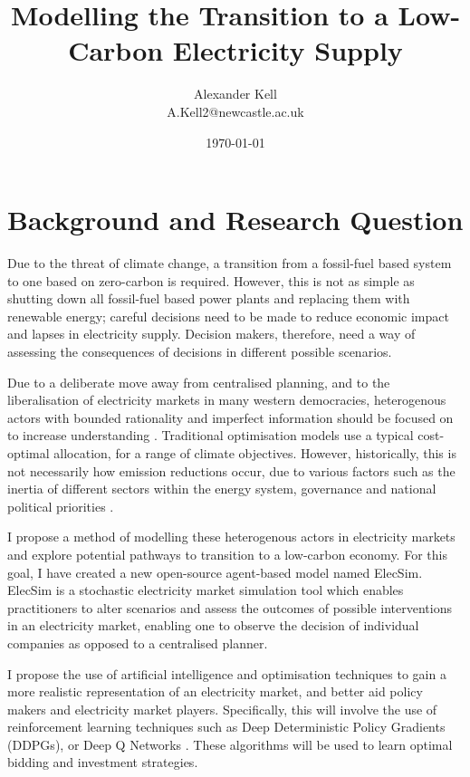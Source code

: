 \documentclass[12pt]{article}
\title{Modelling the Transition to a Low-Carbon Electricity Supply}
\author{Alexander Kell \\ {A.Kell2@newcastle.ac.uk}}
\date{\today}
\begin{document}
\maketitle

\clearpage

\section{Background and Research Question}



Due to the threat of climate change, a transition from a fossil-fuel based system to one based on zero-carbon is required. However, this is not as simple as shutting down all fossil-fuel based power plants and replacing them with renewable energy; careful decisions need to be made to reduce economic impact and lapses in electricity supply. Decision makers, therefore, need a way of assessing the consequences of decisions in different possible scenarios. 

Due to a deliberate move away from centralised planning, and to the liberalisation of electricity markets in many western democracies, heterogenous actors with bounded rationality and imperfect information should be focused on to increase understanding \cite{Kraan2018}. Traditional optimisation models use a typical cost-optimal allocation, for a range of climate objectives. However, historically, this is not necessarily how emission reductions occur, due to various factors such as the inertia of different sectors within the energy system, governance and national political priorities  \cite{PyeS.PriceJ.CroninJ.ButnarI.andWelsby2019}.

I propose a method of modelling these heterogenous actors in electricity markets and explore potential pathways to transition to a low-carbon economy. For this goal, I have created a new open-source agent-based model named ElecSim. ElecSim is a stochastic electricity market simulation tool which enables practitioners to alter scenarios and assess the outcomes of possible interventions in an electricity market, enabling one to observe the decision of individual companies as opposed to a centralised planner.

I propose the use of artificial intelligence and optimisation techniques to gain a more realistic representation of an electricity market, and better aid policy makers and electricity market players. Specifically, this will involve the use of reinforcement learning techniques such as Deep Deterministic Policy Gradients (DDPGs)\cite{Hunt2016}, or Deep Q Networks \cite{Mnih2013}. These algorithms will be used to learn optimal bidding and investment strategies.
\end{document}
